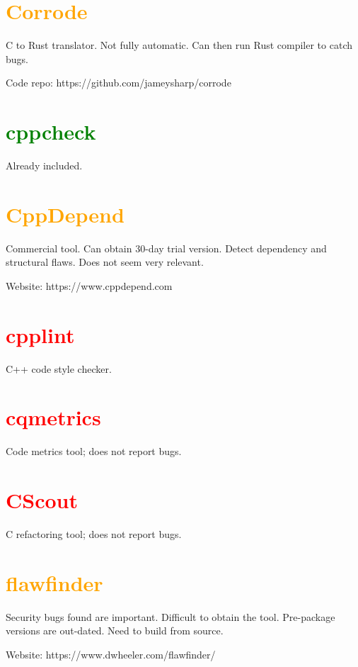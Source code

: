 \documentclass[10pt,letterpaper]{article}
\begin{document}
\section{\textcolor{orange}{Corrode}}

C to Rust translator. Not fully automatic. Can then run Rust compiler to catch bugs.

Code repo: https://github.com/jameysharp/corrode

\section{\textcolor{green}{cppcheck}}

Already included.

\section{\textcolor{orange}{CppDepend}}

Commercial tool. Can obtain 30-day trial version. Detect dependency and
structural flaws. Does not seem very relevant.

Website: https://www.cppdepend.com

\section{\textcolor{red}{cpplint}}

C++ code style checker.

\section{\textcolor{red}{cqmetrics}}

Code metrics tool; does not report bugs.

\section{\textcolor{red}{CScout}}

C refactoring tool; does not report bugs.

\section{\textcolor{orange}{flawfinder}}

Security bugs found are important. Difficult to obtain the tool. Pre-package versions
are out-dated. Need to build from source.

Website: https://www.dwheeler.com/flawfinder/
\end{document}
